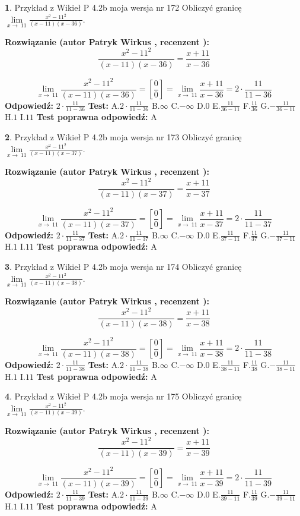\documentclass[12pt, a4paper]{article}
\theoremstyle{definition} %
\newtheorem{zad}{}
\newcommand{\zadStart}[1]{\begin{zad}#1\newline}
\newcommand{\zadStop}{\end{zad}}
\newcommand{\rozwStart}[2]{\noindent \textbf{Rozwiązanie (autor #1 , recenzent #2): }\newline}
\newcommand{\rozwStop}{\newline}
\newcommand{\odpStart}{\noindent \textbf{Odpowiedź:}\newline}
\newcommand{\odpStop}{\newline}
\newcommand{\testStart}{\noindent \textbf{Test:}\newline}
\newcommand{\testStop}{\newline}
\newcommand{\kluczStart}{\noindent \textbf{Test poprawna odpowiedź:}\newline}
\newcommand{\kluczStop}{\newline}
\begin{document}
\zadStart{Przykład z Wikieł P 4.2b moja wersja nr 172}
Obliczyć granicę $\lim\limits_{x\to\ 11}\frac{x^{2}-11^{2}}{(x-11)(x-36)}$.
\zadStop
\rozwStart{Patryk Wirkus}{}
$$\frac{x^{2}-11^{2}}{(x-11)(x-36)}=\frac{x+11}{x-36}$$

$$\lim\limits_{x\to\ 11}\frac{x^{2}-11^{2}}{(x-11)(x-36)}=[\frac{0}{0}]=\lim\limits_{x\to\ 11}\frac{x+11}{x-36}=2 \cdot \frac{11}{11-36}$$
\rozwStop
\odpStart
$2 \cdot \frac{11}{11-36}$
\odpStop
\testStart
A.$2 \cdot \frac{11}{11-36}$
B.$\infty$
C.$-\infty$
D.$0$
E.$\frac{11}{36-11}$
F.$\frac{11}{36}$
G.$-\frac{11}{36-11}$
H.$1$
I.$11$
\testStop
\kluczStart
A
\kluczStop



\zadStart{Przykład z Wikieł P 4.2b moja wersja nr 173}
Obliczyć granicę $\lim\limits_{x\to\ 11}\frac{x^{2}-11^{2}}{(x-11)(x-37)}$.
\zadStop
\rozwStart{Patryk Wirkus}{}
$$\frac{x^{2}-11^{2}}{(x-11)(x-37)}=\frac{x+11}{x-37}$$

$$\lim\limits_{x\to\ 11}\frac{x^{2}-11^{2}}{(x-11)(x-37)}=[\frac{0}{0}]=\lim\limits_{x\to\ 11}\frac{x+11}{x-37}=2 \cdot \frac{11}{11-37}$$
\rozwStop
\odpStart
$2 \cdot \frac{11}{11-37}$
\odpStop
\testStart
A.$2 \cdot \frac{11}{11-37}$
B.$\infty$
C.$-\infty$
D.$0$
E.$\frac{11}{37-11}$
F.$\frac{11}{37}$
G.$-\frac{11}{37-11}$
H.$1$
I.$11$
\testStop
\kluczStart
A
\kluczStop



\zadStart{Przykład z Wikieł P 4.2b moja wersja nr 174}
Obliczyć granicę $\lim\limits_{x\to\ 11}\frac{x^{2}-11^{2}}{(x-11)(x-38)}$.
\zadStop
\rozwStart{Patryk Wirkus}{}
$$\frac{x^{2}-11^{2}}{(x-11)(x-38)}=\frac{x+11}{x-38}$$

$$\lim\limits_{x\to\ 11}\frac{x^{2}-11^{2}}{(x-11)(x-38)}=[\frac{0}{0}]=\lim\limits_{x\to\ 11}\frac{x+11}{x-38}=2 \cdot \frac{11}{11-38}$$
\rozwStop
\odpStart
$2 \cdot \frac{11}{11-38}$
\odpStop
\testStart
A.$2 \cdot \frac{11}{11-38}$
B.$\infty$
C.$-\infty$
D.$0$
E.$\frac{11}{38-11}$
F.$\frac{11}{38}$
G.$-\frac{11}{38-11}$
H.$1$
I.$11$
\testStop
\kluczStart
A
\kluczStop



\zadStart{Przykład z Wikieł P 4.2b moja wersja nr 175}
Obliczyć granicę $\lim\limits_{x\to\ 11}\frac{x^{2}-11^{2}}{(x-11)(x-39)}$.
\zadStop
\rozwStart{Patryk Wirkus}{}
$$\frac{x^{2}-11^{2}}{(x-11)(x-39)}=\frac{x+11}{x-39}$$

$$\lim\limits_{x\to\ 11}\frac{x^{2}-11^{2}}{(x-11)(x-39)}=[\frac{0}{0}]=\lim\limits_{x\to\ 11}\frac{x+11}{x-39}=2 \cdot \frac{11}{11-39}$$
\rozwStop
\odpStart
$2 \cdot \frac{11}{11-39}$
\odpStop
\testStart
A.$2 \cdot \frac{11}{11-39}$
B.$\infty$
C.$-\infty$
D.$0$
E.$\frac{11}{39-11}$
F.$\frac{11}{39}$
G.$-\frac{11}{39-11}$
H.$1$
I.$11$
\testStop
\kluczStart
A
\kluczStop
\end{document}
